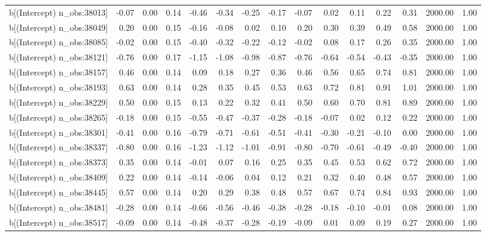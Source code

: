 \begin{table}[ht]
\begin{tabular}{rrrrrrrrrrrrrrr}
  b[(Intercept) n\_obs:38013] & -0.07 & 0.00 & 0.14 & -0.46 & -0.34 & -0.25 & -0.17 & -0.07 & 0.02 & 0.11 & 0.22 & 0.31 & 2000.00 & 1.00 \\ 
  b[(Intercept) n\_obs:38049] & 0.20 & 0.00 & 0.15 & -0.16 & -0.08 & 0.02 & 0.10 & 0.20 & 0.30 & 0.39 & 0.49 & 0.58 & 2000.00 & 1.00 \\ 
  b[(Intercept) n\_obs:38085] & -0.02 & 0.00 & 0.15 & -0.40 & -0.32 & -0.22 & -0.12 & -0.02 & 0.08 & 0.17 & 0.26 & 0.35 & 2000.00 & 1.00 \\ 
  b[(Intercept) n\_obs:38121] & -0.76 & 0.00 & 0.17 & -1.15 & -1.08 & -0.98 & -0.87 & -0.76 & -0.64 & -0.54 & -0.43 & -0.35 & 2000.00 & 1.00 \\ 
  b[(Intercept) n\_obs:38157] & 0.46 & 0.00 & 0.14 & 0.09 & 0.18 & 0.27 & 0.36 & 0.46 & 0.56 & 0.65 & 0.74 & 0.81 & 2000.00 & 1.00 \\ 
  b[(Intercept) n\_obs:38193] & 0.63 & 0.00 & 0.14 & 0.28 & 0.35 & 0.45 & 0.53 & 0.63 & 0.72 & 0.81 & 0.91 & 1.01 & 2000.00 & 1.00 \\ 
  b[(Intercept) n\_obs:38229] & 0.50 & 0.00 & 0.15 & 0.13 & 0.22 & 0.32 & 0.41 & 0.50 & 0.60 & 0.70 & 0.81 & 0.89 & 2000.00 & 1.00 \\ 
  b[(Intercept) n\_obs:38265] & -0.18 & 0.00 & 0.15 & -0.55 & -0.47 & -0.37 & -0.28 & -0.18 & -0.07 & 0.02 & 0.12 & 0.22 & 2000.00 & 1.00 \\ 
  b[(Intercept) n\_obs:38301] & -0.41 & 0.00 & 0.16 & -0.79 & -0.71 & -0.61 & -0.51 & -0.41 & -0.30 & -0.21 & -0.10 & 0.00 & 2000.00 & 1.00 \\ 
  b[(Intercept) n\_obs:38337] & -0.80 & 0.00 & 0.16 & -1.23 & -1.12 & -1.01 & -0.91 & -0.80 & -0.70 & -0.61 & -0.49 & -0.40 & 2000.00 & 1.00 \\ 
  b[(Intercept) n\_obs:38373] & 0.35 & 0.00 & 0.14 & -0.01 & 0.07 & 0.16 & 0.25 & 0.35 & 0.45 & 0.53 & 0.62 & 0.72 & 2000.00 & 1.00 \\ 
  b[(Intercept) n\_obs:38409] & 0.22 & 0.00 & 0.14 & -0.14 & -0.06 & 0.04 & 0.12 & 0.21 & 0.32 & 0.40 & 0.48 & 0.57 & 2000.00 & 1.00 \\ 
  b[(Intercept) n\_obs:38445] & 0.57 & 0.00 & 0.14 & 0.20 & 0.29 & 0.38 & 0.48 & 0.57 & 0.67 & 0.74 & 0.84 & 0.93 & 2000.00 & 1.00 \\ 
  b[(Intercept) n\_obs:38481] & -0.28 & 0.00 & 0.14 & -0.66 & -0.56 & -0.46 & -0.38 & -0.28 & -0.18 & -0.10 & -0.01 & 0.08 & 2000.00 & 1.00 \\ 
  b[(Intercept) n\_obs:38517] & -0.09 & 0.00 & 0.14 & -0.48 & -0.37 & -0.28 & -0.19 & -0.09 & 0.01 & 0.09 & 0.19 & 0.27 & 2000.00 & 1.00 \\ 

\end{tabular}
\end{table}
